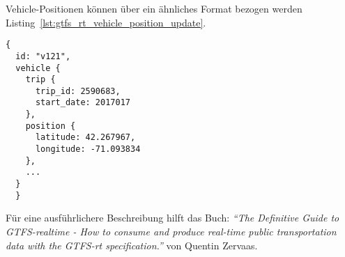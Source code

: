     Vehicle-Positionen können über ein ähnliches Format bezogen werden Listing~\ref{lst:gtfs_rt_vehicle_position_update}.

    \begin{lstlisting}[captionpos={b},caption={Auszug eines GTFS-realtime Vehicle-Position Updates von MBTA},label={lst:gtfs_rt_vehicle_position_update}]
  {
  id: "v121",
  vehicle {
    trip {
      trip_id: 2590683,
      start_date: 2017017
    },
    position {
      latitude: 42.267967,
      longitude: -71.093834
    },
    ...
  }
  }
    \end{lstlisting}

  Für eine ausführlichere Beschreibung hilft das Buch: \textit{"`The Definitive Guide to GTFS-realtime - How to consume and produce real-time public transportation data with the GTFS-rt specification."'}\parencite{zervaas_realtime} von Quentin Zervaas.\\

